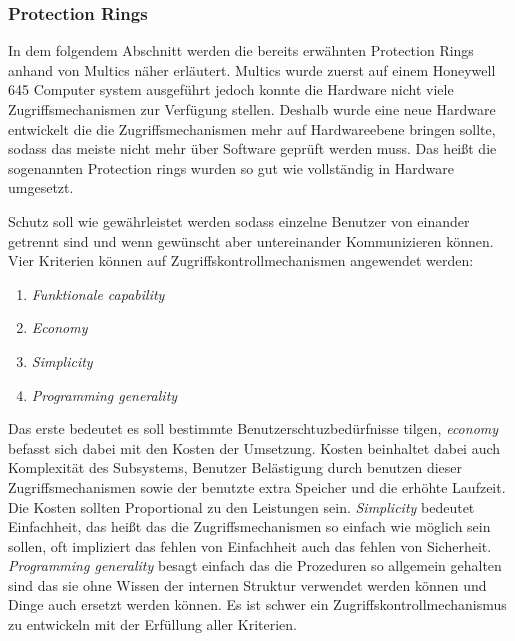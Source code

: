 \documentclass[11pt,technote]{IEEEtran}
\begin{document}
      \subsubsection{Protection Rings} \label{subsubsec:protectrings}
        In dem folgendem Abschnitt werden die bereits erw\"ahnten Protection Rings anhand von Multics n\"aher erl\"autert.
        Multics wurde zuerst auf einem Honeywell 645 Computer system ausgef\"uhrt jedoch konnte die Hardware nicht viele Zugriffsmechanismen zur Verf\"ugung stellen.
        Deshalb wurde eine neue Hardware entwickelt die die Zugriffsmechanismen mehr auf Hardwareebene bringen sollte, sodass das meiste nicht mehr \"uber Software
        gepr\"uft werden muss. Das hei\ss t die sogenannten Protection rings wurden so gut wie vollst\"andig in Hardware umgesetzt. \cite{inproc:protec-rings}
    
        Schutz soll wie gew\"ahrleistet werden sodass einzelne Benutzer von einander getrennt sind und wenn gew\"unscht aber untereinander Kommunizieren k\"onnen.
        Vier Kriterien k\"onnen auf Zugriffskontrollmechanismen angewendet werden: 
        \begin{enumerate}
          \item \textit{Funktionale capability}
          \item \textit{Economy}
          \item \textit{Simplicity}
          \item \textit{Programming generality}
        \end{enumerate}
        Das erste bedeutet es soll bestimmte Benutzerschtuzbed\"urfnisse tilgen, \textit{economy} befasst sich dabei mit den Kosten der Umsetzung.
        Kosten beinhaltet dabei auch Komplexit\"at des Subsystems, Benutzer Bel\"astigung durch benutzen dieser Zugriffsmechanismen sowie der benutzte
        extra Speicher und die erh\"ohte Laufzeit. Die Kosten sollten Proportional zu den Leistungen sein.
        \textit{Simplicity} bedeutet Einfachheit, das hei\ss t das die Zugriffsmechanismen so einfach wie m\"oglich sein sollen, oft
        impliziert das fehlen von Einfachheit auch das fehlen von Sicherheit. \textit{Programming generality} besagt einfach das die Prozeduren so allgemein gehalten sind
        das sie ohne Wissen der internen Struktur verwendet werden k\"onnen und Dinge auch ersetzt werden k\"onnen.
        Es ist schwer ein Zugriffskontrollmechanismus zu entwickeln mit der Erf\"ullung aller Kriterien.
     
\end{document}
